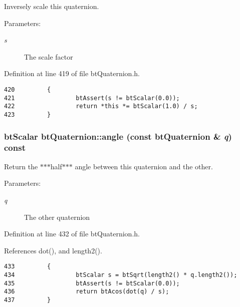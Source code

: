 Inversely scale this quaternion. 

\begin{Desc}
\item[Parameters:]
\begin{description}
\item[{\em s}]The scale factor \end{description}
\end{Desc}


Definition at line 419 of file btQuaternion.h.

\begin{Code}\begin{verbatim}420         {
421                 btAssert(s != btScalar(0.0));
422                 return *this *= btScalar(1.0) / s;
423         }
\end{verbatim}
\end{Code}


\hypertarget{classbt_quaternion_6398a143dbe4bbf6211d90bc8c2dd2bc}{
\subsubsection[angle]{\setlength{\rightskip}{0pt plus 5cm}btScalar btQuaternion::angle (const {\bf btQuaternion} \& {\em q}) const}}
\label{classbt_quaternion_6398a143dbe4bbf6211d90bc8c2dd2bc}


Return the $\ast$$\ast$$\ast$half$\ast$$\ast$$\ast$ angle between this quaternion and the other. 

\begin{Desc}
\item[Parameters:]
\begin{description}
\item[{\em q}]The other quaternion \end{description}
\end{Desc}


Definition at line 432 of file btQuaternion.h.

References dot(), and length2().

\begin{Code}\begin{verbatim}433         {
434                 btScalar s = btSqrt(length2() * q.length2());
435                 btAssert(s != btScalar(0.0));
436                 return btAcos(dot(q) / s);
437         }
\end{verbatim}
\end{Code}





